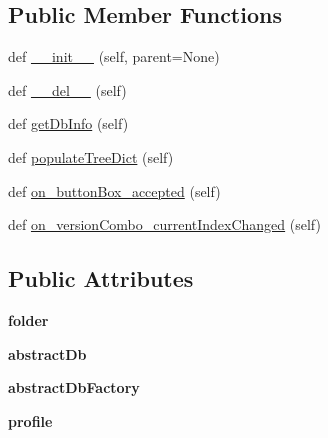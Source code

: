 \subsection*{Public Member Functions}
\begin{DoxyCompactItemize}
\item 
def \mbox{\hyperlink{class_dsg_tools_1_1_user_tools_1_1create__profile_1_1_create_profile_a285922bf2d9235c1694390d9789b7956}{\+\_\+\+\_\+init\+\_\+\+\_\+}} (self, parent=None)
\item 
def \mbox{\hyperlink{class_dsg_tools_1_1_user_tools_1_1create__profile_1_1_create_profile_a36953a9b5268812aa007973c75f81e65}{\+\_\+\+\_\+del\+\_\+\+\_\+}} (self)
\item 
def \mbox{\hyperlink{class_dsg_tools_1_1_user_tools_1_1create__profile_1_1_create_profile_a0d623cfe805e672e761f61036f9f258c}{get\+Db\+Info}} (self)
\item 
def \mbox{\hyperlink{class_dsg_tools_1_1_user_tools_1_1create__profile_1_1_create_profile_aa323abead8349dc6a55e95f88358c7fc}{populate\+Tree\+Dict}} (self)
\item 
def \mbox{\hyperlink{class_dsg_tools_1_1_user_tools_1_1create__profile_1_1_create_profile_a11888e6ef97f1c8acf95e216cb19c28d}{on\+\_\+button\+Box\+\_\+accepted}} (self)
\item 
def \mbox{\hyperlink{class_dsg_tools_1_1_user_tools_1_1create__profile_1_1_create_profile_a79a377d083c06fe91ae4b38014d14cba}{on\+\_\+version\+Combo\+\_\+current\+Index\+Changed}} (self)
\end{DoxyCompactItemize}
\subsection*{Public Attributes}
\begin{DoxyCompactItemize}
\item 
\mbox{\label{class_dsg_tools_1_1_user_tools_1_1create__profile_1_1_create_profile_a1dca53125b7e86748d56221c79b78d60}} 
{\bfseries folder}
\item 
\mbox{\label{class_dsg_tools_1_1_user_tools_1_1create__profile_1_1_create_profile_a753a6e52af92f2b45d1cdae3fcd118d4}} 
{\bfseries abstract\+Db}
\item 
\mbox{\label{class_dsg_tools_1_1_user_tools_1_1create__profile_1_1_create_profile_aef89c40c529bc60aab03118c4420dc05}} 
{\bfseries abstract\+Db\+Factory}
\item 
\mbox{\label{class_dsg_tools_1_1_user_tools_1_1create__profile_1_1_create_profile_a44ad6d8a2f2eeb5a4a22a0a14ed17c26}} 
{\bfseries profile}
\end{DoxyCompactItemize}

